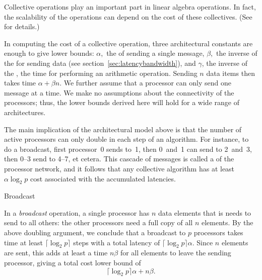 
Collective operations play an important part in linear algebra
operations. In fact, the scalability of the operations can depend on
the cost of these collectives. (See~\cite{Chan2007Collective} for
details.)

In computing the cost of a collective operation, three architectural
constants are enough to give lower bounds: $\alpha$,~the  of
sending a single message, $\beta$,~the inverse of the  for
sending data (see section~\ref{sec:latencybandwidth}), and $\gamma$,
the inverse of the , the
time for performing an arithmetic operation. Sending $n$ data
items then takes time $\alpha +\beta n$. We further assume that a
processor can only send one message at a time. We make no assumptions
about the connectivity of the processors; thus, the lower bounds
derived here will hold for a wide range of architectures.

The main implication of the architectural model above is that the
number of active processors can only double in each step of an
algorithm. For instance, to do a broadcast, first processor~0 sends
to~1, then 0~and~1 can send to 2~and~3, then 0--3 send to 4--7, et
cetera. This cascade of messages is called a  of the processor network, and it follows that any
collective algorithm has at least $\alpha\log_2p$ cost associated with
the accumulated latencies.

 {Broadcast}

In a \emph{broadcast} operation, a single processor has $n$ data elements
that is needs to send to all others: the other processors need a full
copy of all $n$ elements.  By
the above doubling argument, we conclude that a broadcast to $p$
processors takes time at least $\lceil\log_2 p\rceil$ steps with a
total latency of $\lceil\log_2 p\rceil \alpha$. Since $n$ elements are
sent, this adds at least a time $n\beta$ for all elements to leave the
sending processor, giving a total cost lower bound of
\[ \lceil\log_2 p\rceil \alpha+n\beta. \]

